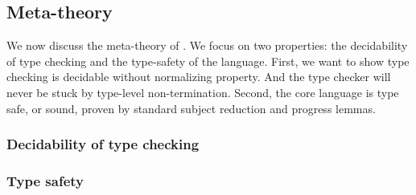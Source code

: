\subsection{Meta-theory}\label{sec:core:meta}
We now discuss the meta-theory of \name. We focus on two properties: the decidability of type checking and the type-safety of the language. First, we want to show type checking \name is decidable without normalizing property. And the type checker will never be stuck by type-level non-termination. Second, the core language is type safe, or sound, proven by standard subject reduction and progress lemmas.

\subsubsection{Decidability of type checking}

\subsubsection{Type safety}
